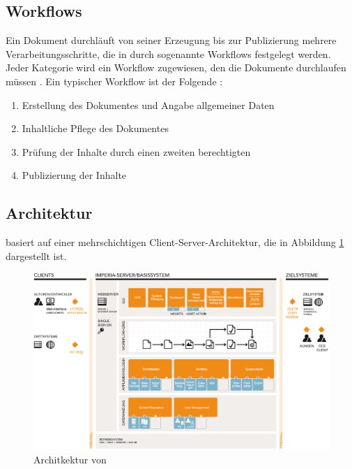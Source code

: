     \subsection{Workflows}
        Ein Dokument durchläuft von seiner Erzeugung bis zur
        Publizierung mehrere Verarbeitungsschritte,
        die in {\imperia} durch sogenannte Workflows festgelegt werden.
        Jeder Kategorie wird ein Workflow zugewiesen,
        den die Dokumente durchlaufen müssen
        \cite[Kapitel 1.1.5]{imperia:ecmd}.
        Ein typischer Workflow ist der Folgende
        \cite[Kapitel 1.1]{imperia:ecmd}:

        \begin{enumerate}
            \item Erstellung des Dokumentes und Angabe allgemeiner Daten
            \item Inhaltliche Pflege des Dokumentes
            \item Prüfung der Inhalte durch einen zweiten berechtigten \editor
            \item Publizierung der Inhalte
        \end{enumerate}

    \subsection{Architektur}
        \label{section:imperiaArch}
        {\imperia} basiert auf einer mehrschichtigen Client-Server-Architektur,
        die in Abbildung \ref{image:imperiaArchitektur} dargestellt ist.

        \begin{figure}[htb]
            \centering
            \includegraphics[width=\textwidth]{../resources/imperia/architektur.png}
            \caption{Architkektur von {\imperia} \cite{imperia:ecmd}}
            \label{image:imperiaArchitektur}
        \end{figure}

